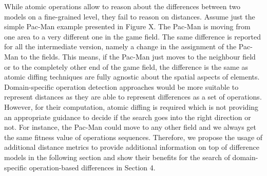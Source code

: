 While atomic operations allow to reason about the differences between two models on a fine-grained level, they fail to reason on distances. 
Assume just the simple Pac-Man example presented in Figure X. The Pac-Man is moving from one area to a very different one in the game field. The same difference is reported for all the intermediate version, namely a change in the assignment of the Pac-Man to the fields. This means, if the Pac-Man just moves to the neighbour field or to the completely other end of the game field, the difference is the same as atomic diffing techniques are fully agnostic about the spatial aspects of elements. Domain-specific operation detection approaches would be more suitable to represent distances as they are able to represent differences as a set of operations. However, for their computation, atomic diffing is required which is not providing an appropriate guidance to decide if the search goes into the right direction or not. For instance, the Pac-Man could move to any other field and we always get the same fitness value of operations sequences. Therefore, we propose the usage of additional distance metrics to provide additional information on top of difference models in the following section and show their benefits for the search of domain-specific operation-based differences in Section 4.   